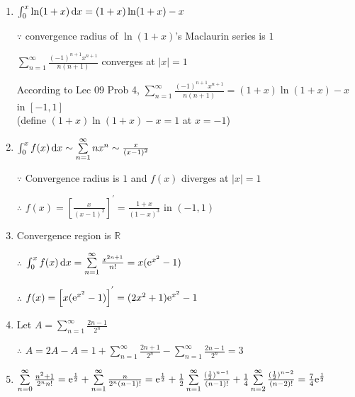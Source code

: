 \begin{enumerate}[1]
\begin{enumerate}[(1)]
        \item
        $\int_0^x  \ln (1+x)\dif x=(1+x) \ln (1+x)-x$
        \par $\because$ convergence radius of $ \ln (1+x)$'s Maclaurin series is $1$
        \par $\sum\limits_{n=1}^\infty \frac{(-1)^{n+1}x^{n+1}}{n(n+1)}$ converges at $|x|=1$
        \par According to Lec 09 Prob 4, $\sum\limits_{n=1}^\infty \frac{(-1)^{n+1}x^{n+1}}{n(n+1)}=(1+x ) \ln (1+x)-x$ in $[-1,1]$ \\(define $(1+x) \ln (1+x)-x=1$ at $x=-1$)
        
        \item
        \par $\int_0^x f(x)\dif x\sim\sum\limits_{n=1}^\infty nx^n\sim \frac{x}{(x-1)^2}$
        \par $\because$ Convergence radius is $1$ and $f(x)$ diverges at $|x|=1$
        \par $\therefore$ $f(x)=\left[\frac{x}{(x-1)^2}\right]^{'}=\frac{1+x}{(1-x)^3}$ in $(-1,1)$
        
        \item
        Convergence region is $\mathbb{R}$
        \par $\therefore$ $\int_0^x f(x)\dif x = \sum\limits_{n=1}^\infty \frac{x^{2n+1}}{n!}=x(\me^{x^2}-1)$
        \par $\therefore$ $f(x)=\left[x(\mathrm{e}^{x^2}-1)\right]^{'}=(2x^2+1)\mathrm{e}^{x^2}-1$
        
        \item
        Let $A=\sum\limits_{n=1}^\infty \frac{2n-1}{2^n}$
        \par $\therefore$ $A=2A-A=1+\sum\limits_{n=1}^\infty  \frac{2n+1}{2^n}    -\sum\limits_{n=1}^\infty \frac{2n-1}{2^n}=3$
        
        \item
        $\sum\limits_{n=0}^\infty \frac{n^2+1}{2^n n!}=\mathrm{e}^{\frac{1}{2}}+\sum\limits_{n=1}^\infty \frac{n}{2^n(n-1)!}=\mathrm{e}^{\frac{1}{2}}+\frac{1}{2}\sum\limits_{n=1}^\infty\frac{(\frac{1}{2})^{n-1}}{(n-1)!}+\frac{1}{4}\sum\limits_{n=2}^\infty \frac{(\frac{1}{2})^{n-2}}{(n-2)!}=\frac{7}{4}\mathrm{e}^{\frac{1}{2}}$
        \end{enumerate}
    \end{enumerate}
